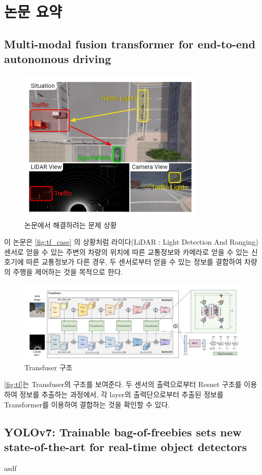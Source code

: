 \section{논문 요약}{\label{sec:review}}

\subsection{Multi-modal fusion transformer for end-to-end autonomous driving}{\label{subsec:Transfuser}}
\begin{figure}[htp]
    \centering
    \includegraphics[width=0.8\textwidth]{figures/Transfuser_case.png}
    \caption{논문에서 해결하려는 문제 상황}
    \label{fig:tf_case}
\end{figure}
이 논문은 \autoref{fig:tf_case} 의 상황처럼
라이다(LiDAR : Light Detection And Ranging) 센서로 얻을 수 있는 주변의 차량의 위치에 따른 교통정보와
카메라로 얻을 수 있는 신호기에 따른 교통정보가 다른 경우,
두 센서로부터 얻을 수 있는 정보를 결합하여 차량의 주행을 제어하는 것을 목적으로 한다.
\begin{figure}[htp]
    \centering
    \includegraphics[width=\textwidth]{figures/Transfuser.png}
    \caption{Transfuser 구조}
    \label{fig:tf}
\end{figure}
\autoref{fig:tf}는 Transfuser의 구조를 보여준다.
두 센서의 출력으로부터 Resnet 구조\cite{Resnet}를 이용하여 정보를 추출하는 과정에서,
각 layer의 출력단으로부터 추출된 정보를 Transformer\cite{Transformer}를 이용하여 결합하는 것을 확인할 수 있다.


\subsection{YOLOv7: Trainable bag-of-freebies sets new state-of-the-art for real-time object detectors}{\label{subsec:yolov7}}

asdf